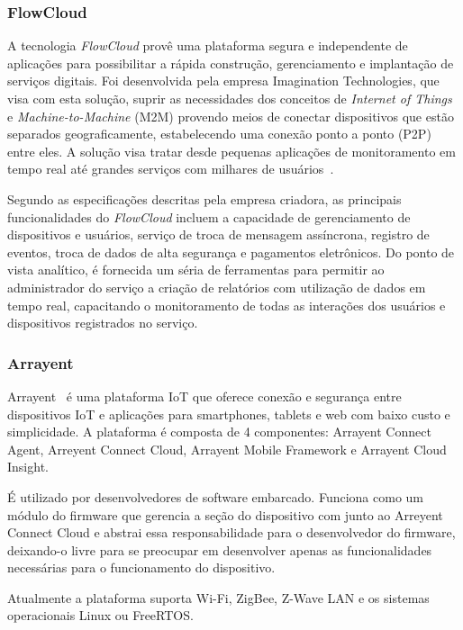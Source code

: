 \subsubsection{FlowCloud}
A tecnologia \textit{FlowCloud} provê uma plataforma segura e independente de aplicações para possibilitar
a rápida construção, gerenciamento e implantação de serviços digitais. Foi desenvolvida pela empresa
Imagination Technologies, que visa com esta solução, suprir as necessidades dos conceitos de
\textit{Internet of Things} e \textit{Machine-to-Machine} (M2M) provendo meios de conectar dispositivos
que estão separados geograficamente, estabelecendo uma conexão ponto a ponto (P2P) entre eles.
A solução visa tratar desde pequenas aplicações de monitoramento em tempo real até grandes serviços
com milhares de usuários~\cite{flowcloud}.

Segundo as especificações descritas pela empresa criadora, as principais funcionalidades do \textit{FlowCloud}
incluem a capacidade de gerenciamento de dispositivos e usuários, serviço de troca de mensagem assíncrona,
registro de eventos, troca de dados de alta segurança e pagamentos eletrônicos. Do ponto de vista analítico,
é fornecida um séria de ferramentas para permitir ao administrador do serviço a criação de relatórios com
utilização de dados em tempo real, capacitando o monitoramento de todas as interações dos usuários e
dispositivos registrados no serviço.

\subsubsection{Arrayent}
Arrayent~\cite{arrayent} é uma plataforma IoT que oferece conexão e segurança entre dispositivos IoT e aplicações
para  smartphones, tablets e web com baixo custo e simplicidade. A plataforma é composta de 4 componentes:
Arrayent Connect Agent, Arreyent Connect Cloud, Arrayent Mobile Framework e Arrayent Cloud Insight.

É utilizado por desenvolvedores de software embarcado. Funciona como um módulo do firmware que gerencia a
seção do dispositivo com junto ao Arreyent Connect Cloud e abstrai essa responsabilidade para o desenvolvedor
do firmware, deixando-o livre para se preocupar em desenvolver apenas as funcionalidades necessárias para o
funcionamento do dispositivo.

Atualmente a plataforma suporta Wi-Fi, ZigBee, Z-Wave LAN e os sistemas operacionais Linux ou FreeRTOS.

